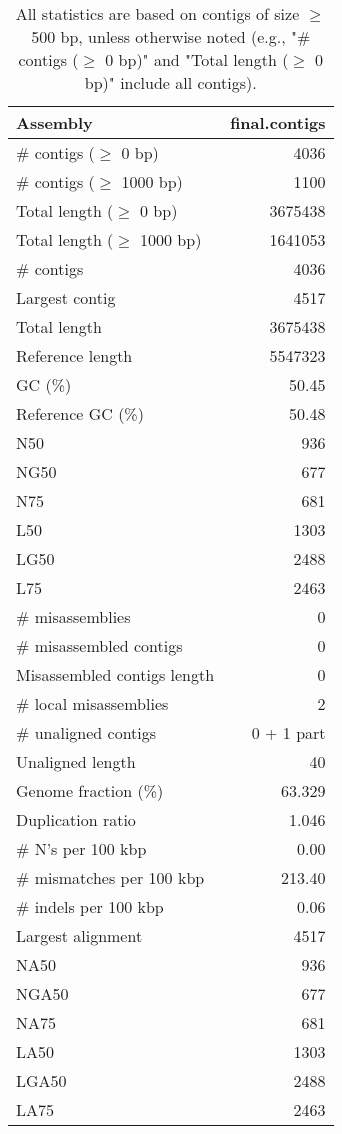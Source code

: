 \documentclass[12pt,a4paper]{article}
\begin{document}
\begin{table}[ht]
\begin{center}
\caption{All statistics are based on contigs of size $\geq$ 500 bp, unless otherwise noted (e.g., "\# contigs ($\geq$ 0 bp)" and "Total length ($\geq$ 0 bp)" include all contigs).}
\begin{tabular}{|l*{1}{|r}|}
\hline
Assembly & final.contigs \\ \hline
\# contigs ($\geq$ 0 bp) & 4036 \\ \hline
\# contigs ($\geq$ 1000 bp) & 1100 \\ \hline
Total length ($\geq$ 0 bp) & 3675438 \\ \hline
Total length ($\geq$ 1000 bp) & 1641053 \\ \hline
\# contigs & 4036 \\ \hline
Largest contig & 4517 \\ \hline
Total length & 3675438 \\ \hline
Reference length & 5547323 \\ \hline
GC (\%) & 50.45 \\ \hline
Reference GC (\%) & 50.48 \\ \hline
N50 & 936 \\ \hline
NG50 & 677 \\ \hline
N75 & 681 \\ \hline
L50 & 1303 \\ \hline
LG50 & 2488 \\ \hline
L75 & 2463 \\ \hline
\# misassemblies & 0 \\ \hline
\# misassembled contigs & 0 \\ \hline
Misassembled contigs length & 0 \\ \hline
\# local misassemblies & 2 \\ \hline
\# unaligned contigs & 0 + 1 part \\ \hline
Unaligned length & 40 \\ \hline
Genome fraction (\%) & 63.329 \\ \hline
Duplication ratio & 1.046 \\ \hline
\# N's per 100 kbp & 0.00 \\ \hline
\# mismatches per 100 kbp & 213.40 \\ \hline
\# indels per 100 kbp & 0.06 \\ \hline
Largest alignment & 4517 \\ \hline
NA50 & 936 \\ \hline
NGA50 & 677 \\ \hline
NA75 & 681 \\ \hline
LA50 & 1303 \\ \hline
LGA50 & 2488 \\ \hline
LA75 & 2463 \\ \hline
\end{tabular}
\end{center}
\end{table}
\end{document}
